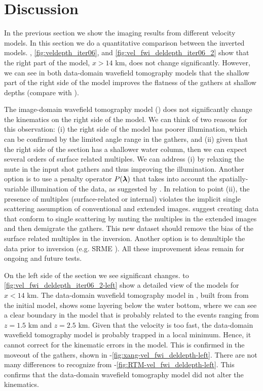 \section{Discussion}
In the previous section we show the imaging results from different velocity models.
 In this section we do a quantitative comparison between the inverted models. 
 , \ref{fig:veldepth_iter06}, and \ref{fig:vel_fwi_deldepth_iter06_2}
 show that the right part of the model, $x>14$ km, does not change significantly.
 However, we can see in both data-domain wavefield tomography models that the shallow part of the right side of the model 
improves the flatness of the gathers at shallow depths (compare  
with ).

 The image-domain wavefield tomography model ()
 does not significantly change the kinematics on the right side of the model.
 We can think of two reasons for this observation: (i) the right side of 
the model has poorer illumination, which can be confirmed by the limited
angle range in the gathers, and (ii) given that the right side of the section has a shallower 
water column, then we can expect several orders of surface related multiples. We can address (i)
by relaxing the mute in the input shot gathers and thus improving the illumination.
 Another option is to use a penalty operator $P({\boldsymbol{\lambda}})$ that 
takes into account the spatially-variable illumination of the data, as suggested by \cite{tony_seg:cwp12}.
  In relation to point (ii), the presence of multiples (surface-related or internal)
 violates the implicit single scattering assumption of conventional and extended images.
 \cite{Wiktor} suggest creating data that conform
to single scattering by muting the multiples in the extended images and then
demigrate the gathers. This new dataset should remove the bias of the surface
related multiples in the inversion. Another option is to 
demultiple the data prior to inversion (e.g. SRME \citep{SRME}). All these improvement ideas
remain for ongoing and future tests.

On the left side of the section we see significant changes. 
 to \ref{fig:vel_fwi_deldepth_iter06_2-left} show a detailed view
of the models for $x<14$ km. The data-domain wavefield tomography model in ,
 built from from the initial model, shows some layering below the water bottom, where we can 
see a clear boundary in the model that is probably related to the events 
ranging from $z=1.5$ km and $z=2.5$ km. Given that the velocity is too fast,
 the data-domain wavefield tomography model is probably trapped in a local minimum. Hence, it cannot correct
for the kinematic errors in the model. This is confirmed in the moveout of the 
gathers, shown in -\ref{fig:xang-vel_fwi_deldepth-left}.
 There are not many differences to recognize from -\ref{fig:RTM-vel_fwi_deldepth-left}. This confirms
 that the data-domain wavefield tomography model did not alter the kinematics. 

